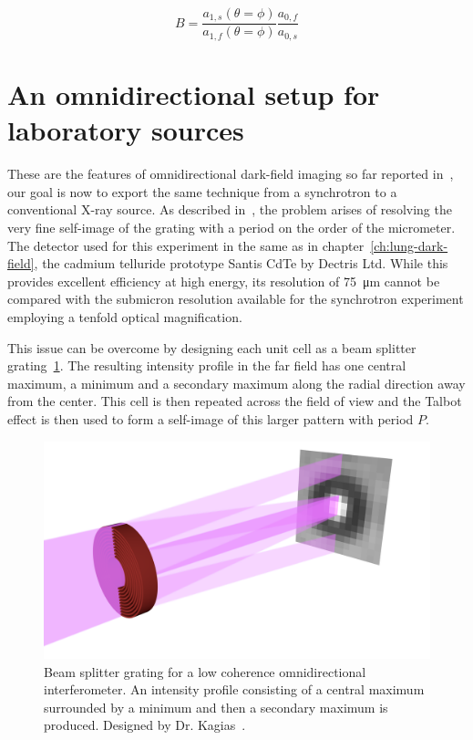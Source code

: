 \begin{equation}
    B = \frac{a_{1,s}(\theta = \phi)}{a_{1,f}(\theta =
\phi)}\frac{a_{0,f}}{a_{0,s}}
    \label{eq:dark-field-omnidirectional}
\end{equation}

\section{An omnidirectional setup for laboratory sources}
These are the features of omnidirectional dark-field imaging so far reported
in~\parencite{PhysRevLett.116.093902}, our goal is now to export the same
technique from a synchrotron to a conventional X-ray source.
As described in~\parencite{kagias2018omnidir}, the problem arises of resolving
the very fine self-image of the grating with a period on the order of the
micrometer. The detector used for this experiment in the same as in
chapter~\ref{ch:lung-dark-field}, the cadmium telluride prototype Santis
CdTe by Dectris Ltd. While this provides excellent efficiency at high
energy, its resolution of \SI{75}{\micro\meter} cannot be compared with the
submicron resolution available for the synchrotron experiment employing a tenfold optical magnification.

This issue can be overcome by designing each unit cell as a beam splitter
grating~\ref{fig:beam-splitter}. The resulting intensity profile in the far
field has one central maximum, a minimum and a secondary maximum along the
radial direction away from the center. This cell
is then repeated across the field of view and the Talbot effect is then used
to form a self-image of this larger pattern with period $P$.

\begin{figure}[htb]
    \centering
    \includegraphics[width=\textwidth]{gfx/omnidirectional/unit_cell.png}
    \caption{Beam splitter grating for a low coherence omnidirectional
    interferometer. An intensity profile consisting of a central maximum
surrounded by a minimum and then a secondary maximum is produced. Designed
by Dr. Kagias~\parencite{kagias2018omnidir}.}
    \label{fig:beam-splitter}
\end{figure}

